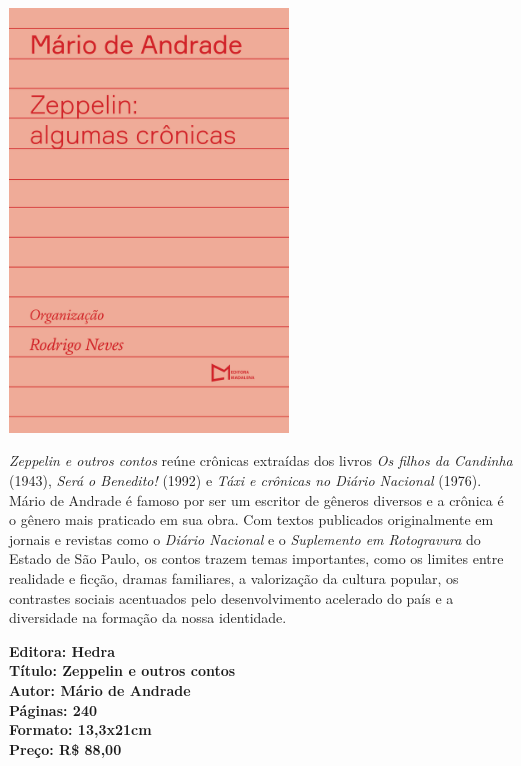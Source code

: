 \begin{center}
\hspace*{-3.6cm}
\hspace*{3.1cm}\includegraphics[width=74mm]{./grid/zepelin.png}
\end{center}

\hspace*{-7cm}\hrulefill\hspace*{-7cm}

\medskip

\noindent{}\textit{Zeppelin e outros contos} reúne crônicas extraídas dos livros \textit{Os
filhos da Candinha} (1943), \textit{Será o Benedito!} (1992) e \textit{Táxi e crônicas no Diário Nacional} (1976). Mário de Andrade é famoso por ser um escritor de gêneros diversos e a crônica é o gênero mais praticado em sua obra.
Com textos publicados originalmente em jornais e revistas como o \textit{Diário Nacional} e o \textit{Suplemento em Rotogravura} do Estado de São Paulo, os contos trazem temas importantes, como os limites entre realidade e ficção, dramas familiares, a valorização da cultura popular, os contrastes sociais acentuados pelo desenvolvimento acelerado do país e a diversidade na formação da nossa identidade.

\vfill

\noindent\begin{minipage}[c]{1\linewidth}
{\small\textbf{
\hspace*{-.1cm}Editora: Hedra\\
Título: Zeppelin e outros contos\\
Autor: Mário de Andrade\\ 
Páginas: 240\\
Formato: 13,3x21cm\\
Preço: R\$ 88,00\\
}}
\end{minipage}

